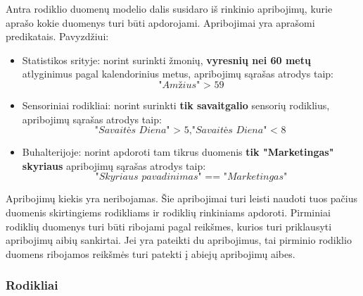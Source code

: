 \documentclass{VUMIFPSbakalaurinis}
\begin{document}
Antra rodiklio duomenų modelio dalis susidaro iš rinkinio apribojimų, kurie aprašo kokie duomenys turi būti apdorojami. Apribojimai yra aprašomi predikatais.
Pavyzdžiui:
\begin{itemize}
    \item Statistikos srityje: norint surinkti žmonių, \textbf{vyresnių nei 60 metų} atlyginimus pagal kalendorinius metus, apribojimų sąrašas atrodys taip: \[\textit{"Amžius" > 59}\]
    \item Sensoriniai rodikliai: norint surinkti \textbf{tik savaitgalio} sensorių rodiklius, apribojimų sąrašas atrodys taip: \[\textit{"Savaitės Diena" > 5}, \textit{"Savaitės Diena" < 8}\]
    \item Buhalterijoje: norint apdoroti tam tikrus duomenis \textbf{tik "Marketingas" skyriaus} apribojimų sąrašas atrodys taip: \[\textit{"Skyriaus pavadinimas" == "Marketingas"}\] 
\end{itemize}  
Apribojimų kiekis yra neribojamas. Šie apribojimai turi leisti naudoti tuos pačius duomenis skirtingiems rodikliams ir rodiklių rinkiniams apdoroti. Pirminiai rodiklių duomenys turi būti ribojami pagal reikšmes, kurios turi priklausyti apribojimų aibių sankirtai. Jei yra pateikti du apribojimus, tai pirminio rodiklio duomens ribojamos reikšmės turi patekti į abiejų apribojimų aibes. 
\par

\subsubsection{Rodikliai}
\end{document}
